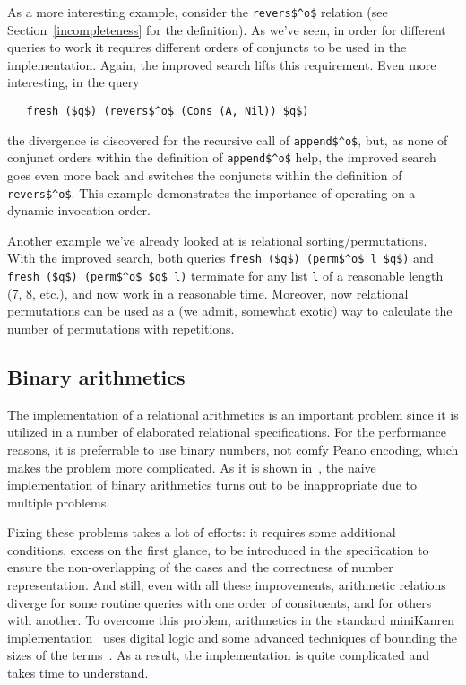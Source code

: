 As a more interesting example, consider the \lstinline|revers$^o$| relation (see Section~\ref{incompleteness}
for the definition). As we've seen, in order for different queries to work it requires different orders of conjuncts 
to be used in the implementation. Again, the improved search lifts this requirement.
Even more interesting, in the query 

\begin{lstlisting}
   fresh ($q$) (revers$^o$ (Cons (A, Nil)) $q$)
\end{lstlisting}

\noindent the divergence is discovered for the recursive call of \lstinline|append$^o$|, but,
as none of conjunct orders within the definition of \lstinline|append$^o$| help, the
improved search goes even more back and switches the conjuncts within the definition of
\lstinline|revers$^o$|. This example demonstrates the importance of operating on 
a dynamic invocation order.

Another example we've already looked at is relational sorting/permutations. 
With the improved search, both queries \lstinline|fresh ($q$) (perm$^o$ l $q$)| and 
\lstinline|fresh ($q$) (perm$^o$ $q$ l)| terminate for any list \lstinline|l| of a reasonable 
length (7, 8, etc.), and now work in a reasonable time. Moreover, now
relational permutations can be used as a (we admit, somewhat exotic) way to calculate 
the number of permutations with repetitions.

\subsection{Binary arithmetics}

The implementation of a relational arithmetics is an important problem since it is utilized
in a number of elaborated relational specifications. For the performance reasons, it is 
preferrable to use binary numbers, not comfy Peano encoding, which makes the problem 
more complicated. As it is shown in~\cite{WillThesis}, the naive implementation of 
binary arithmetics turns out to be inappropriate due to multiple problems. 

Fixing these problems takes a lot of efforts: it requires some additional conditions, 
excess on the first glance, to be introduced in the specification to ensure the non-overlapping 
of the cases and the correctness of number representation. And still, even with all these 
improvements, arithmetic relations diverge for some routine queries with one order of 
consituents, and for others with another. To overcome this problem, 
arithmetics in the standard miniKanren implementation~\cite{TRS} uses digital logic and 
some advanced techniques of bounding the sizes of the terms~\cite{KiselyovArithmetic}. 
As a result, the implementation is quite complicated and takes time to understand.

